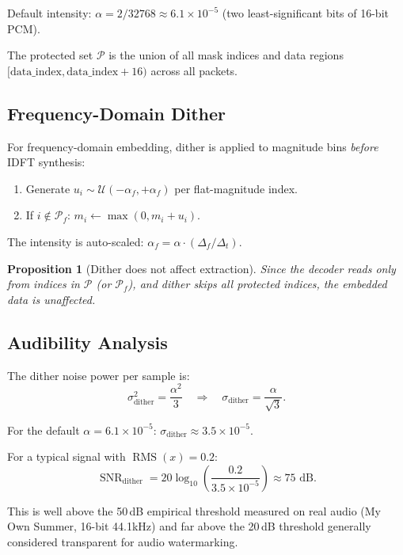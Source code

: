 \documentclass[11pt,a4paper]{article}
\newtheorem{proposition}[theorem]{Proposition}
\DeclareMathOperator{\rms}{RMS}
\DeclareMathOperator{\snr}{SNR}
\begin{document}
Default intensity: $\alpha = 2 / 32768 \approx 6.1 \times 10^{-5}$
(two least-significant bits of 16-bit PCM).

The protected set $\mathcal{P}$ is the union of all mask indices and
data regions $[\mathrm{data\_index}, \mathrm{data\_index} + 16)$ across
all packets.

\subsection{Frequency-Domain Dither}

For frequency-domain embedding, dither is applied to magnitude bins
\emph{before} IDFT synthesis:
\begin{enumerate}
    \item Generate $u_i \sim \mathcal{U}(-\alpha_f, +\alpha_f)$ per flat-magnitude index.
    \item If $i \notin \mathcal{P}_f$: $m_i \leftarrow \max(0, m_i + u_i)$.
\end{enumerate}

The intensity is auto-scaled: $\alpha_f = \alpha \cdot (\Delta_f / \Delta_t)$.

\begin{proposition}[Dither does not affect extraction]
Since the decoder reads only from indices in $\mathcal{P}$ (or $\mathcal{P}_f$),
and dither skips all protected indices, the embedded data is unaffected.
\end{proposition}

\subsection{Audibility Analysis}

The dither noise power per sample is:
\[
    \sigma_\text{dither}^2 = \frac{\alpha^2}{3}
    \quad\Rightarrow\quad
    \sigma_\text{dither} = \frac{\alpha}{\sqrt{3}}.
\]

For the default $\alpha = 6.1 \times 10^{-5}$:
$\sigma_\text{dither} \approx 3.5 \times 10^{-5}$.

For a typical signal with $\rms(x) = 0.2$:
\[
    \snr_\text{dither} = 20 \log_{10}\!\left(\frac{0.2}{3.5 \times 10^{-5}}\right) \approx 75 \text{ dB}.
\]

This is well above the 50\,dB empirical threshold measured on real audio
(My Own Summer, 16-bit 44.1kHz) and far above the 20\,dB threshold
generally considered transparent for audio watermarking.


\end{document}
